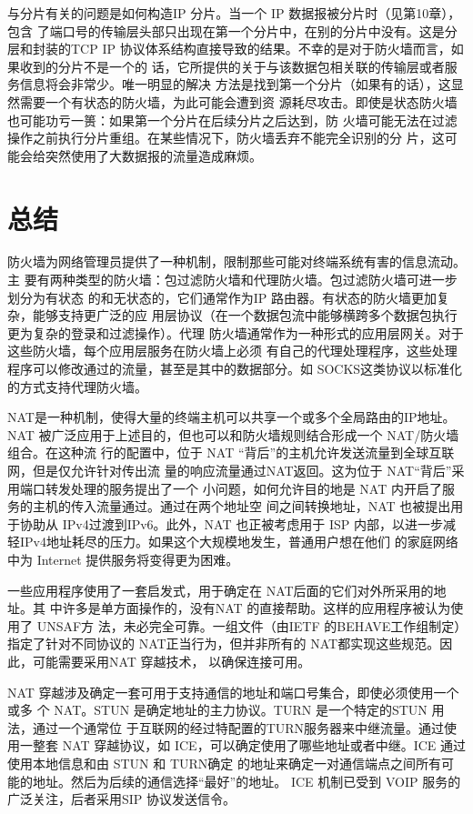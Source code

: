 与分片有关的问题是如何构造IP 分片。当一个 IP 数据报被分片时（见第10章），包含
了端口号的传输层头部只出现在第一个分片中，在别的分片中没有。这是分层和封装的TCP
IP 协议体系结构直接导致的结果。不幸的是对于防火墙而言，如果收到的分片不是一个的
话，它所提供的关于与该数据包相关联的传输层或者服务信息将会非常少。唯一明显的解决
方法是找到第一个分片（如果有的话），这显然需要一个有状态的防火墙，为此可能会遭到资
源耗尽攻击。即使是状态防火墙也可能功亏一篑：如果第一个分片在后续分片之后达到，防
火墙可能无法在过滤操作之前执行分片重组。在某些情况下，防火墙丢弃不能完全识别的分
片，这可能会给突然使用了大数据报的流量造成麻烦。

\section{总结}

防火墙为网络管理员提供了一种机制，限制那些可能对终端系统有害的信息流动。主
要有两种类型的防火墙：包过滤防火墙和代理防火墙。包过滤防火墙可进一步划分为有状态
的和无状态的，它们通常作为IP 路由器。有状态的防火墙更加复杂，能够支持更广泛的应
用层协议（在一个数据包流中能够横跨多个数据包执行更为复杂的登录和过滤操作）。代理
防火墙通常作为一种形式的应用层网关。对于这些防火墙，每个应用层服务在防火墙上必须
有自己的代理处理程序，这些处理程序可以修改通过的流量，甚至是其中的数据部分。如
SOCKS这类协议以标准化的方式支持代理防火墙。

NAT是一种机制，使得大量的终端主机可以共享一个或多个全局路由的IP地址。NAT
被广泛应用于上述目的，但也可以和防火墙规则结合形成一个 NAT/防火墙组合。在这种流
行的配置中，位于 NAT “背后”的主机允许发送流量到全球互联网，但是仅允许针对传出流
量的响应流量通过NAT返回。这为位于 NAT“背后”采用端口转发处理的服务提出了一个
小问题，如何允许目的地是 NAT 内开启了服务的主机的传入流量通过。通过在两个地址空
间之间转换地址，NAT 也被提出用于协助从 IPv4过渡到IPv6。此外，NAT 也正被考虑用于
ISP 内部，以进一步减轻IPv4地址耗尽的压力。如果这个大规模地发生，普通用户想在他们
的家庭网络中为 Internet 提供服务将变得更为困难。

一些应用程序使用了一套启发式，用于确定在 NAT后面的它们对外所采用的地址。其
中许多是单方面操作的，没有NAT 的直接帮助。这样的应用程序被认为使用了 UNSAF方
法，未必完全可靠。一组文件（由IETF 的BEHAVE工作组制定）指定了针对不同协议的
NAT正当行为，但并非所有的 NAT都实现这些规范。因此，可能需要采用NAT 穿越技术，
以确保连接可用。

NAT 穿越涉及确定一套可用于支持通信的地址和端口号集合，即使必须使用一个或多
个 NAT。STUN 是确定地址的主力协议。TURN 是一个特定的STUN 用法，通过一个通常位
于互联网的经过特配置的TURN服务器来中继流量。通过使用一整套 NAT 穿越协议，如
ICE，可以确定使用了哪些地址或者中继。ICE 通过使用本地信息和由 STUN 和 TURN确定
的地址来确定一对通信端点之间所有可能的地址。然后为后续的通信选择“最好”的地址。
ICE 机制已受到 VOIP 服务的广泛关注，后者采用SIP 协议发送信令。

